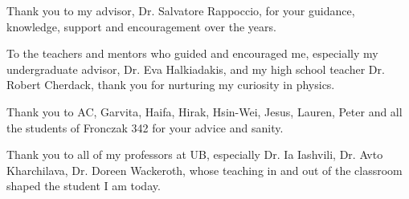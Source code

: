 
Thank you to my advisor, Dr. Salvatore Rappoccio, for your guidance, knowledge, support and encouragement over the years.

To the teachers and mentors who guided and encouraged me, especially my undergraduate advisor, Dr. Eva Halkiadakis, and my high school teacher Dr. Robert Cherdack, thank you for nurturing my curiosity in physics.

Thank you to AC, Garvita, Haifa, Hirak, Hsin-Wei, Jesus, Lauren, Peter and all the students of Fronczak 342 for your advice and sanity.

Thank you to all of my professors at UB, especially Dr. Ia Iashvili, Dr. Avto Kharchilava, Dr. Doreen Wackeroth, whose teaching in and out of the classroom shaped the student I am today.

